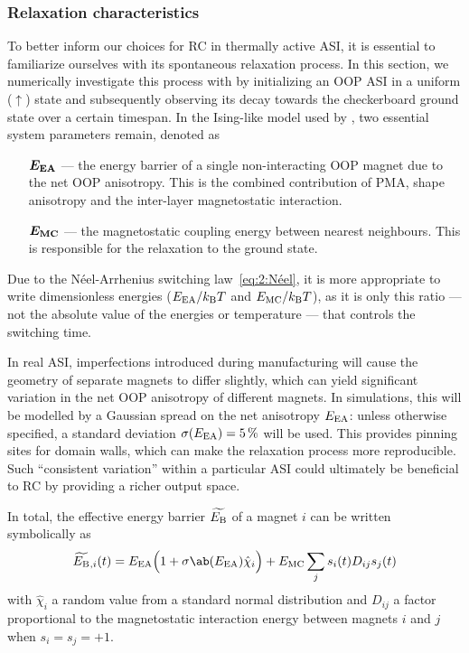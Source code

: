 \subsubsection{Relaxation characteristics}
To better inform our choices for RC in thermally active ASI, it is essential to familiarize ourselves with its spontaneous relaxation process.
In this section, we numerically investigate this process with \hotspice by initializing an OOP ASI in a uniform ($\uparrow$) state and subsequently observing its decay towards the checkerboard ground state over a certain timespan.
In the Ising-like model used by \hotspice, two essential system parameters remain, denoted as
\begin{itemize}[leftmargin=4.1em]
	\item[$\boldsymbol{E_\mathrm{EA}}$ ---] the energy barrier of a single non-interacting OOP magnet due to the net OOP anisotropy.
	This is the combined contribution of PMA, shape anisotropy and the inter-layer magnetostatic interaction.
	\item[$\boldsymbol{E_\mathrm{MC}}$ ---] the magnetostatic coupling energy between nearest neighbours.
	This is responsible for the relaxation to the ground state.
\end{itemize}
Due to the N\'eel-Arrhenius switching law~\eqref{eq:2:Néel}, it is more appropriate to write dimensionless energies ($\EEA/\kBT$ and $\EMC/\kBT$), as it is only this ratio --- not the absolute value of the energies or temperature --- that controls the switching time. \par
In real ASI, imperfections introduced during manufacturing will cause the geometry of separate magnets to differ slightly, which can yield significant variation in the net OOP anisotropy of different magnets.
In simulations, this will be modelled by a Gaussian spread on the net anisotropy $E_\mathrm{EA}$: unless otherwise specified, a standard deviation $\sigma(E_\mathrm{EA}) = \SI{5}{\percent}$ will be used.
This provides pinning sites for domain walls, which can make the relaxation process more reproducible.
Such ``consistent variation'' within a particular ASI could ultimately be beneficial to RC by providing a richer output space. \par
In total, the effective energy barrier $\widetilde{E_\mathrm{B}}$ of a magnet $i$ can be written symbolically as
\begin{equation}
	\label{eq:3:OOP_relaxation_EBeff}
	\EBeff{}_{,i}(t) = \EEA \Big(1 + \sigma\ab(\EEA) \hat{\chi}_i \Big) + \EMC \sum_j s_i(t) D_{ij} s_j(t) 
\end{equation}
with $\hat{\chi}_i$ a random value from a standard normal distribution and $D_{ij}$ a factor proportional to the magnetostatic interaction energy between magnets $i$ and $j$ when $s_i=s_j=+1$. \\\par

